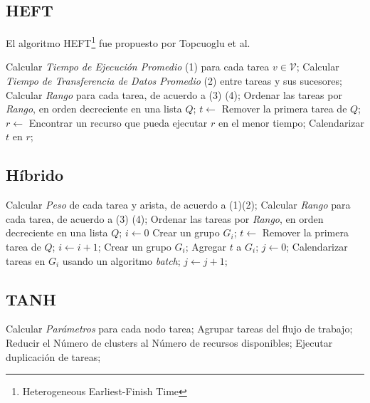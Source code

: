 \subsection{HEFT}
El algoritmo HEFT\footnote{Heterogeneous Earliest-Finish Time} fue propuesto por Topcuoglu et al. \cite{topcuoglu2002performance}

\label{alg:heft}
\begin{algorithmic}[1]
\State Calcular \emph{Tiempo de Ejecución Promedio} (1) para cada tarea $v \in \mathcal{V}$;
\State Calcular \emph{Tiempo de Transferencia de Datos Promedio} (2) entre tareas y sus sucesores;
\State Calcular \emph{Rango} para cada tarea, de acuerdo a (3) (4);
\State Ordenar las tareas por \emph{Rango}, en orden decreciente en una lista $Q$;
	\State $t \gets$ Remover la primera tarea de $Q$;
	\State $r \gets$ Encontrar un recurso que pueda ejecutar $r$ en el menor tiempo;
	\State Calendarizar $t$ en $r$;
\EndWhile
\end{algorithmic}

\subsection{Híbrido}
\label{alg:hybrid}
\begin{algorithmic}[1]
\State Calcular \emph{Peso} de cada tarea y arista, de acuerdo a (1)(2);
\State Calcular \emph{Rango} para cada tarea, de acuerdo a (3) (4);
\State Ordenar las tareas por \emph{Rango}, en orden decreciente en una lista $Q$;
\State $i \gets 0$
\State Crear un grupo $G_i$;
	\State $t \gets$ Remover la primera tarea de $Q$;
		\State $i \gets i + 1$;
		\State Crear un grupo $G_i$;
	\EndIf
	\State Agregar $t$ a $G_i$;
\EndWhile
\State $j \gets 0$;
	\State Calendarizar tareas en $G_i$ usando un algoritmo \emph{batch};
	\State $j \gets j + 1$;
\EndWhile
\end{algorithmic}

\subsection{TANH}
\label{alg:tanh}
\begin{algorithmic}[1]
\State Calcular \emph{Parámetros} para cada nodo tarea;
\State Agrupar tareas del flujo de trabajo;
	\State Reducir el Número de clusters al Número de recursos disponibles;
\Else
	\State Ejecutar duplicación de tareas;
\EndIf
\end{algorithmic}

